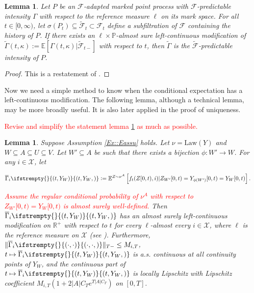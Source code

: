 \documentclass[12pt]{article}
\newcommand{\mb}{\mathbb}
\newcommand{\mc}{\mathcal}
\newcommand{\ra}{\rightarrow}
\newcommand{\ov}{\overline}
\newcommand{\te}{\text}
\newcommand{\tr}{\textcolor{red}}
\newcommand{\ind}{\hspace{24pt}}
\newcommand{\pr}{\mb{P}}							%
\newcommand{\ex}[1]{\mb{E}\left[#1\right]}			%
\newcommand{\exmu}[2]{\mb{E}^{#1}\left[#2\right]}	%
\newcommand{\defeq}{:=}								%
\newcommand{\sta}{\mc{X}}							%
\newcommand{\Sm}{\ell}								%
\newcommand{\F}{\mc{F}}								%
\newcommand{\vind}[1]{_{#1}}						%
\newcommand{\tmi}[1]{#1}							%
\newcommand{\vpara}[1]{^{#1}}						%
\newcommand{\stpara}[1]{_{#1}}						%
\newcommand{\tpara}[1]{_{#1}}						%
\newcommand{\jumpbd}[1]{C_{#1}}						%
\newcommand{\tmepro}[3]{
\ifstrempty{#3}{
	\left(#1,#2\right)}{
	\left(#1,#2,#3\right)}}							%
\newcommand{\Xg}{Y}									%
\newcommand{\alt}[1]{\tilde{#1}}					%
\renewcommand{\mark}{\kappa}						%
\newcommand{\ratee}{\Gamma}							%
\newcommand{\cratee}{\alt{\ratee}}					%
\newcommand{\grate}{\ov{\ratee}}					%
\newcommand{\rp}{P}									%
\newcommand{\mm}{\nu}								%
\newcommand{\law}{\te{Law}}							%
\newcommand{\const}{M}								%
\newcommand{\sttpara}[2]{_{#1,#2}}					%
\newcommand{\Xh}{Z}									%
\newtheorem{lem}[thms]{Lemma}
\begin{document}
\begin{lem}
Let \(\rp\) be an \(\F\)-adapted marked point process with \(\F\)-predictable intensity \(\ratee\) with respect to the reference measure \(\Sm\) on its mark space. For all \(t \in [0,\infty)\), let \(\sigma(\rp_{t}) \subseteq \alt{\F}_{t}\subset \F_{t}\) define a subfiltration of \(\F\) containing the history of \(\rp\). If there exists an \(\ell\times \pr\)-almost sure left-continuous modification of \(\cratee(t,\mark) := \ex{\ratee(t,\mark)|\alt{\F}_{t-}}\) with respect to \(t\), then \(\cratee\) is the \(\alt{\F}\)-predictable intensity of \(\rp\). 
\label{Ex::filtering}
\end{lem}

\begin{proof}
This is a restatement of \cite[theorem 14.3.III]{DalVer08}.
\end{proof}

Now we need a simple method to know when the conditional expectation has a left-continuous modification. The following lemma, although a technical lemma, may be more broadly useful. It is also later applied in the proof of uniqueness.

\ind \tr{Revise and simplify the statement lemma \ref{Ex::leftmod} as much as possible.}
\begin{lem}
Suppose Assumption \ref{Ex::Eassu} holds. Let \(\mm = \law(\Xg)\) and \(W\subseteq A \subseteq U\subseteq V\). Let \(W'\subseteq A\) be such that there exists a bijection \(\phi:W' \ra W\). For any \(i \in \sta\), let

\[\grate\stpara{i}\tmepro{t}{\Xg\vind{W}}{} \defeq \exmu{\Xh\sim \mm\vpara{A}}{f_t(\Xh\tmi{[0,t)},i)|\Xh\vind{W'}\tmi{[0,t)} = \Xg\vind{\phi(W')}\tmi{[0,t)} = \Xg\vind{W}\tmi{[0,t)}}.\]

\tr{Assume the regular conditional probability of \(\mm\vpara{A}\) with respect to \(\Xh\vind{W'}\tmi{[0,t)} = \Xg\vind{W}\tmi{[0,t)}\) is almost surely well-defined.} Then \(\grate\stpara{i}\tmepro{t}{\Xg\vind{W}}{}\) has an almost surely left-continuous modification on \(\mb{R}^+\) with respect to \(t\) for every \(\ell\)-almost every \(i \in \sta\), where \(\ell\) is the reference measure on \(\sta\) (see \cite[section \ref{F-not::p}]{F}). Furthermore, \(\|\grate\stpara{i}\tmepro{\cdot}{\cdot}{}\|\tpara{T-} \leq \const\sttpara{i}{T}\), \(t\mapsto\grate\stpara{i}\tmepro{t}{\Xg\vind{W}}{}\) is a.s. continuous at all continuity points of \(\Xg\vind{W}\), and the continuous part of \(t\mapsto\grate\stpara{i}\tmepro{t}{\Xg\vind{W}}{}\) is locally Lipschitz with Lipschitz coefficient \(\const\sttpara{i}{T}\left(1 + 2|A|\jumpbd{T}e^{T|A|\jumpbd{T}}\right)\) on \([0,T]\).
\label{Ex::leftmod}
\end{lem}
\end{document}
